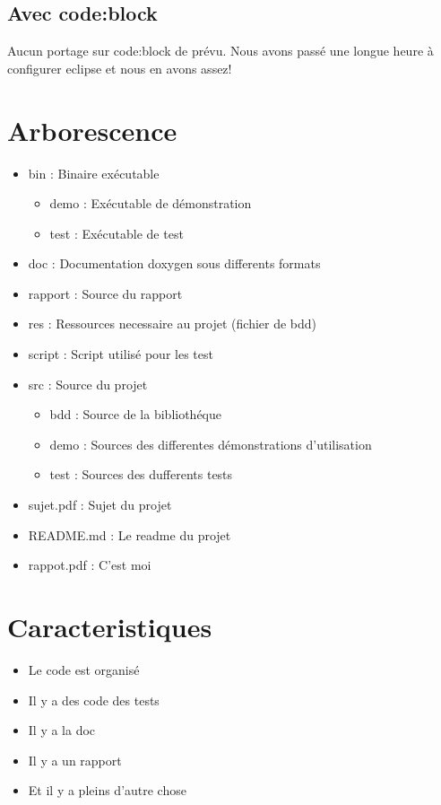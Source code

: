 \documentclass[a4paper]{article}
\begin{document}
\subsection{Avec code:block}

Aucun portage sur code:block de prévu. 
Nous avons passé une longue heure à configurer eclipse et nous en avons assez!

\section{Arborescence}

\begin{itemize}
\item bin : Binaire exécutable
\begin{itemize}
  \item demo : Exécutable de démonstration
  \item test : Exécutable de test
\end{itemize}
\item doc : Documentation doxygen sous differents formats
\item rapport : Source du rapport
\item res : Ressources necessaire au projet (fichier de bdd)
\item script  : Script utilisé pour les test
\item src : Source du projet
\begin{itemize}
  \item bdd   : Source de la bibliothéque
  \item demo  : Sources des differentes démonstrations d'utilisation
  \item test  : Sources des dufferents tests
\end{itemize}

\item sujet.pdf  : Sujet du projet
\item README.md  : Le readme du projet 
\item rappot.pdf : C'est moi
\end{itemize}

\section{Caracteristiques}

\begin{itemize}
	\item Le code est organisé
	\item Il y a des code des tests
	\item Il y a la doc
	\item Il y a un rapport
	\item Et il y a pleins d'autre chose
\end{itemize}
\end{document}
